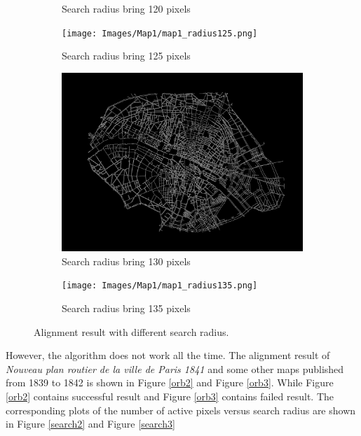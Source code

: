 \begin{figure}[h!]
\begin{subfigure}{0.48\textwidth}
         \caption{Search radius bring 120 pixels}
     \end{subfigure}
     \hfill
     \begin{subfigure}{0.48\textwidth}
         \centering
         \texttt{[image: Images/Map1/map1\_radius125.png]}
         \caption{Search radius bring 125 pixels}
     \end{subfigure}
     \hfill
     \begin{subfigure}{0.48\textwidth}
         \centering
         \includegraphics[width=\textwidth]{Images/Map1/map1_radius130.png}
         \caption{Search radius bring 130 pixels}
     \end{subfigure}
     \hfill
     \begin{subfigure}{0.48\textwidth}
         \centering
         \texttt{[image: Images/Map1/map1\_radius135.png]}
         \caption{Search radius bring 135 pixels}
     \end{subfigure}
        \caption{Alignment result with different search radius.}
        \label{orb1:other}
\end{figure}

However, the algorithm does not work all the time. The alignment result of \textit{Nouveau plan routier de la ville de Paris 1841} and some other maps published from 1839 to 1842 is shown in Figure \ref{orb2} and Figure \ref{orb3}. While Figure \ref{orb2} contains successful result and Figure \ref{orb3} contains failed result. The corresponding plots of the number of active pixels versus search radius are shown in Figure \ref{search2} and Figure \ref{search3}

